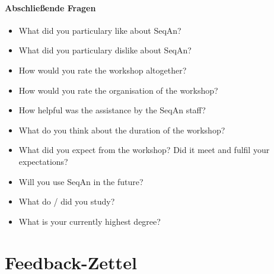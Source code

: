 \paragraph{Abschließende Fragen}
\begin{itemize}
  \item What did you particulary like about SeqAn?
  \item What did you particulary dislike about SeqAn?
  \item How would you rate the workshop altogether?
  \item How would you rate the organisation of the workshop?	
  \item How helpful was the assistance by the SeqAn staff?
  \item What do you think about the duration of the workshop?
  \item What did you expect from the workshop? Did it meet and fulfil your expectations?
  \item Will you use SeqAn in the future?
  \item What do / did you study?
  \item What is your currently highest degree?
\end{itemize}

\vfill
	 	



\section{Feedback-Zettel}
\label{app:feedback}

\setlength{\fboxsep}{0pt}%
\setlength{\fboxrule}{0.3pt}%

